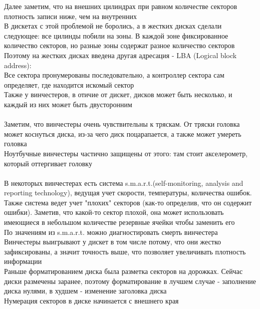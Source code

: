 \documentclass[12pt]{article}
\begin{document}
Далее заметим, что на внешних цилиндрах при равном количестве секторов плотность записи ниже, чем на внутренних\\
В дискетах с этой проблемой не боролись, а в жестких дисках сделали следующее: все цилинды побили на зоны. В каждой зоне фиксированное количество секторов, но разные зоны содержат разное количество секторов\\
Поэтому на жестких дисках введена другая адресация - LBA (Logical block address):\\
Все сектора пронумерованы последовательно, а контроллер сектора сам определяет, где находится искомый сектор\\
Также у винчестеров, в отичие от дискет, дисков может быть несколько, и каждый из них может быть двусторонним\\\\
Заметим, что винчестеры очень чувствительны к тряскам. От тряски головка может коснуться диска, из-за чего диск поцарапается, а также может умереть головка\\
Ноутбучные винчестеры частично защищены от этого: там стоит акселерометр, который оттергивает головку\\\\
В некоторых винчестерах есть система s.m.a.r.t.(self-monitoring, analysis and reporting technology), ведущая учет скорости, температуры, количества ошибок. Также система ведет учет "плохих" секторов (как-то определив, что он содержит ошибки). Заметив, что какой-то сектор плохой, она может использовать имеющиеся в небольшом количестве резервные ячейки чтобы заменить его\\
По значениям из s.m.a.r.t. можно диагностировать смерть винчестера\\
Винчестеры выигрывают у дискет в том числе потому, что они жестко зафиксированы, а значит точность выше, что позволяет увеличивать плотность информации\\
Раньше форматированием диска была разметка секторов на дорожках. Сейчас диски размечены заранее, поэтому форматирование в лучшем случае - заполнение диска нулями, в худшем - изменение заголовка диска\\
Нумерация секторов в диске начинается с внешнего края\\
\end{document}
